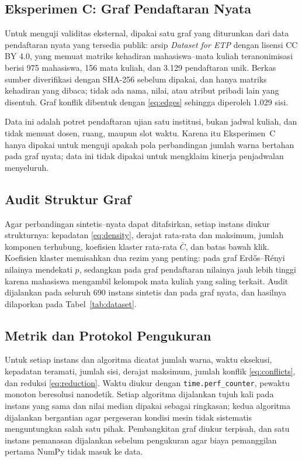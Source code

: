 \documentclass[conference,a4paper]{IEEEtran}
\begin{document}


\subsection{Eksperimen C: Graf Pendaftaran Nyata}
Untuk menguji validitas eksternal, dipakai satu graf yang diturunkan dari data
pendaftaran nyata yang tersedia publik: arsip \emph{Dataset for ETP}
\cite{le2025etp} dengan lisensi CC BY 4.0, yang memuat matriks kehadiran
mahasiswa--mata kuliah teranonimisasi berisi 975 mahasiswa, 156 mata kuliah, dan
3.129 pendaftaran unik. Berkas sumber diverifikasi dengan SHA-256 sebelum
dipakai, dan hanya matriks kehadiran yang dibaca; tidak ada nama, nilai, atau
atribut pribadi lain yang disentuh. Graf konflik dibentuk dengan
\eqref{eq:edges} sehingga diperoleh 1.029 sisi.

Data ini adalah potret pendaftaran ujian satu institusi, bukan jadwal kuliah,
dan tidak memuat dosen, ruang, maupun slot waktu. Karena itu Eksperimen~C hanya
dipakai untuk menguji apakah pola perbandingan jumlah warna bertahan pada graf
nyata; data ini tidak dipakai untuk mengklaim kinerja penjadwalan menyeluruh.

\subsection{Audit Struktur Graf}
Agar perbandingan sintetis--nyata dapat ditafsirkan, setiap instans diukur
strukturnya: kepadatan \eqref{eq:density}, derajat rata-rata dan maksimum,
jumlah komponen terhubung, koefisien klaster rata-rata $\bar{C}$, dan batas
bawah klik. Koefisien klaster memisahkan dua rezim yang penting: pada graf
Erd\H{o}s--R\'enyi nilainya mendekati $p$, sedangkan pada graf pendaftaran
nilainya jauh lebih tinggi karena mahasiswa mengambil kelompok mata kuliah yang
saling terkait. Audit dijalankan pada seluruh 690 instans sintetis dan pada graf
nyata, dan hasilnya dilaporkan pada Tabel~\ref{tab:dataset}.

\subsection{Metrik dan Protokol Pengukuran}
Untuk setiap instans dan algoritma dicatat jumlah warna, waktu eksekusi,
kepadatan teramati, jumlah sisi, derajat maksimum, jumlah konflik
\eqref{eq:conflicts}, dan reduksi \eqref{eq:reduction}. Waktu diukur dengan
\texttt{time.perf\_counter}, pewaktu monoton beresolusi nanodetik. Setiap
algoritma dijalankan tujuh kali pada instans yang sama dan nilai median dipakai
sebagai ringkasan; kedua algoritma dijalankan bergantian agar pergeseran kondisi
mesin tidak sistematis menguntungkan salah satu pihak. Pembangkitan graf diukur
terpisah, dan satu instans pemanasan dijalankan sebelum pengukuran agar biaya
pemanggilan pertama NumPy tidak masuk ke data.
\end{document}

